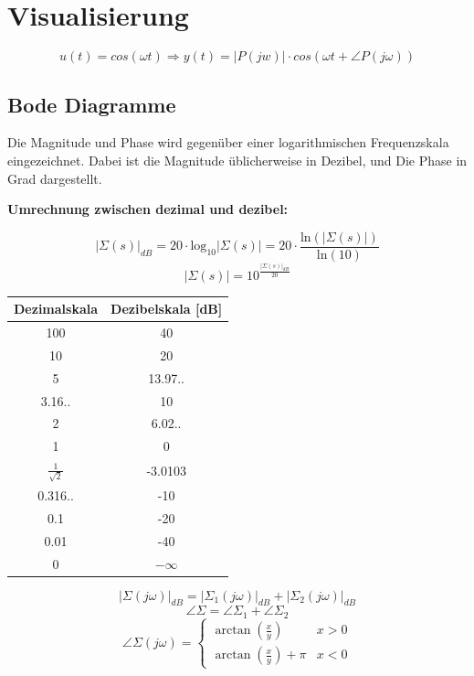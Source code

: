 \vfill\null\columnbreak
\section{Visualisierung}  
    \[u(t)=cos(\omega t) \Rightarrow y(t)=|P(jw)|\cdot cos(\omega t+\angle P(j\omega))\]
  \subsection{Bode Diagramme}
        Die Magnitude und Phase wird gegenüber einer logarithmischen Frequenzskala eingezeichnet.
        Dabei ist die Magnitude üblicherweise in Dezibel, und Die Phase in Grad dargestellt.
        
        \textbf{Umrechnung zwischen dezimal und dezibel:}
        
        \[|\Sigma(s)|_{dB} = 20 \cdot \textrm{log}_{10}|\Sigma(s)|= 20\cdot\frac{\textrm{ln}(|\Sigma(s)|)}{\textrm{ln}(10)}\]
        \[|\Sigma(s)| = 10^{\frac{|\Sigma(s)|_{dB}}{20}}\]
        
        \begin{center}
        {\renewcommand{\arraystretch}{1.4}
            \begin{tabular}{c|c}
        
            Dezimalskala    &   Dezibelskala [dB]\\
            \hline
            100 &   40  \\
            10  &   20  \\
            5   &   13.97..\\
            3.16.. & 10\\
            2   &   6.02..\\
            1   &   0   \\
            $\frac{1}{\sqrt{2}}$  &   -3.0103\\
            0.316.. & -10\\
            0.1 &   -20 \\
            0.01    &   -40\\
            0       &   $-\infty$
            \end{tabular}}
        \end{center}
        \[|\Sigma(j\omega)|_{dB} = |\Sigma_1(j\omega)|_{dB}+|\Sigma_2(j\omega)|_{dB}\]
        \[\angle\Sigma= \angle\Sigma_{1}+ \angle\Sigma_{2}\]
        \[\angle\Sigma(j\omega)=
        \begin{cases}
            \arctan(\frac{x}{y}) & x > 0\\
            \arctan(\frac{x}{y})+\pi & x<0
      \end{cases}
      \]
                 
